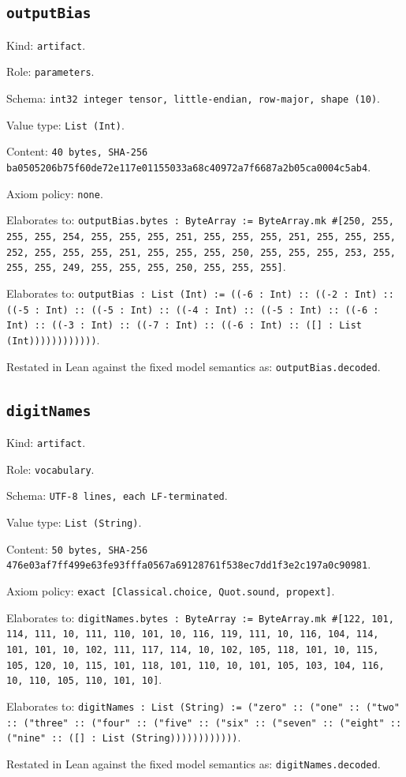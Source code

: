 \documentclass[11pt]{article}
\begin{document}
\subsection*{\texttt{outputBias}}
\noindent Kind: \texttt{artifact}.\par
\noindent Role: \texttt{parameters}.\par
\noindent Schema: \texttt{int32 integer tensor, little-endian, row-major, shape (10)}.\par
\noindent Value type: \texttt{List (Int)}.\par
\noindent Content: \texttt{40 bytes, SHA-256 ba0505206b75f60de72e117e01155033a68c40972a7f6687a2b05ca0004c5ab4}.\par
\noindent Axiom policy: \texttt{none}.\par
\noindent Elaborates to: \texttt{outputBias.bytes : ByteArray := ByteArray.mk \#[250, 255, 255, 255, 254, 255, 255, 255, 251, 255, 255, 255, 251, 255, 255, 255, 252, 255, 255, 255, 251, 255, 255, 255, 250, 255, 255, 255, 253, 255, 255, 255, 249, 255, 255, 255, 250, 255, 255, 255]}.\par
\noindent Elaborates to: \texttt{outputBias : List (Int) := ((-6 : Int) :: ((-2 : Int) :: ((-5 : Int) :: ((-5 : Int) :: ((-4 : Int) :: ((-5 : Int) :: ((-6 : Int) :: ((-3 : Int) :: ((-7 : Int) :: ((-6 : Int) :: ([] : List (Int))))))))))))}.\par
\noindent Restated in Lean against the fixed model semantics as: \texttt{outputBias.decoded}.\par
\subsection*{\texttt{digitNames}}
\noindent Kind: \texttt{artifact}.\par
\noindent Role: \texttt{vocabulary}.\par
\noindent Schema: \texttt{UTF-8 lines, each LF-terminated}.\par
\noindent Value type: \texttt{List (String)}.\par
\noindent Content: \texttt{50 bytes, SHA-256 476e03af7ff499e63fe93fffa0567a69128761f538ec7dd1f3e2c197a0c90981}.\par
\noindent Axiom policy: \texttt{exact [Classical.choice, Quot.sound, propext]}.\par
\noindent Elaborates to: \texttt{digitNames.bytes : ByteArray := ByteArray.mk \#[122, 101, 114, 111, 10, 111, 110, 101, 10, 116, 119, 111, 10, 116, 104, 114, 101, 101, 10, 102, 111, 117, 114, 10, 102, 105, 118, 101, 10, 115, 105, 120, 10, 115, 101, 118, 101, 110, 10, 101, 105, 103, 104, 116, 10, 110, 105, 110, 101, 10]}.\par
\noindent Elaborates to: \texttt{digitNames : List (String) := ("zero" :: ("one" :: ("two" :: ("three" :: ("four" :: ("five" :: ("six" :: ("seven" :: ("eight" :: ("nine" :: ([] : List (String))))))))))))}.\par
\noindent Restated in Lean against the fixed model semantics as: \texttt{digitNames.decoded}.\par
\end{document}
